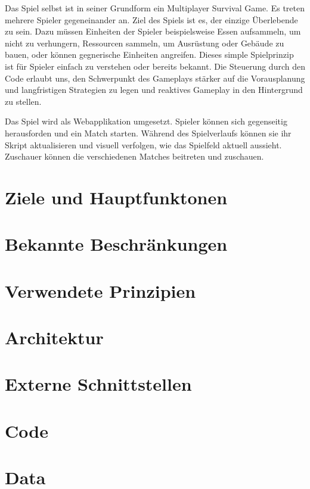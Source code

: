 \documentclass[a4paper, 11pt]{scrartcl}
\let\oldsection\section
\renewcommand\section{\clearpage\oldsection}
\begin{document}
Das Spiel selbst ist in seiner Grundform ein Multiplayer Survival Game. Es treten mehrere Spieler gegeneinander an. Ziel des Spiels ist es, der einzige Überlebende zu sein. Dazu müssen  Einheiten der Spieler beispielsweise Essen aufsammeln, um nicht zu verhungern, Ressourcen sammeln, um Ausrüstung oder Gebäude zu bauen, oder können gegnerische Einheiten angreifen. Dieses simple Spielprinzip ist für Spieler einfach zu verstehen oder bereits bekannt. Die Steuerung durch den Code erlaubt uns, den Schwerpunkt des Gameplays stärker auf die Vorausplanung und langfristigen Strategien zu legen und reaktives Gameplay in den Hintergrund zu stellen.

Das Spiel wird als Webapplikation umgesetzt. Spieler können sich gegenseitig herausforden und ein Match starten. Während des Spielverlaufs können sie ihr Skript aktualisieren und visuell verfolgen, wie das Spielfeld aktuell aussieht. Zuschauer können die verschiedenen Matches beitreten und zuschauen.

\section{Ziele und Hauptfunktonen}

\section{Bekannte Beschränkungen}

\section{Verwendete Prinzipien}

\section{Architektur}

\section{Externe Schnittstellen}

\section{Code}

\section{Data}
\end{document}
